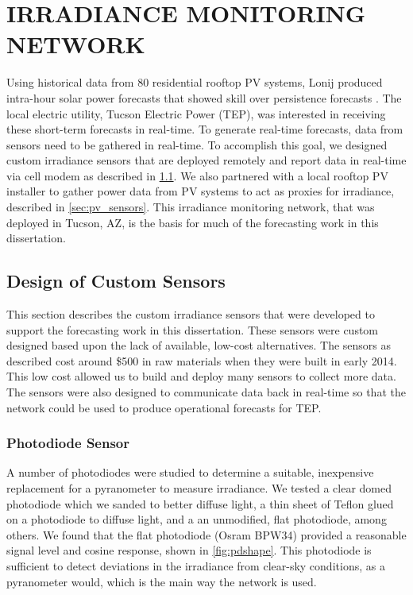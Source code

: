 \chapter{IRRADIANCE MONITORING NETWORK}
\label{chap:sens_net}

Using historical data from 80 residential rooftop PV systems, Lonij
\etal produced intra-hour solar power forecasts that showed skill over
persistence forecasts \citep{Lonij2013}.
The local electric utility, Tucson Electric Power (TEP), was interested in
receiving these short-term forecasts in real-time.
To generate real-time forecasts, data from sensors need to be gathered
in real-time.
To accomplish this goal, we designed custom irradiance sensors that
are deployed remotely and report data in real-time via cell modem as
described in \cref{sec:custom_sensors}.
We also partnered with a local rooftop PV installer to gather power
data from PV systems to act as proxies for irradiance, described in
\cref{sec:pv_sensors}.
This irradiance monitoring network, that was deployed in Tucson, AZ, is
the basis for much of the forecasting work in this dissertation.


\section{Design of Custom Sensors}
\label{sec:custom_sensors}
This section describes the custom irradiance sensors that were
developed to support the forecasting work in this dissertation.
These sensors were custom designed based upon the lack of available,
low-cost alternatives.
The sensors as described cost around \$500 in raw materials when they
were built in early 2014.
This low cost allowed us to build and deploy many sensors to collect
more data.
The sensors were also designed to communicate data back in real-time
so that the network could be used to produce operational forecasts for
TEP.

\subsection{Photodiode Sensor}
\label{sec:photodiode}
A number of photodiodes were studied to determine a suitable,
inexpensive replacement for a pyranometer to measure irradiance.
We tested a clear domed photodiode which we sanded to better diffuse
light, a thin sheet of Teflon glued on a photodiode to diffuse light,
and a an unmodified, flat photodiode, among others.
We found that the flat photodiode (Osram BPW34) provided a reasonable
signal level and cosine response, shown in \cref{fig:pdshape}.
This photodiode is sufficient to detect deviations in the irradiance from
clear-sky conditions, as a pyranometer would, which is the main way
the network is used.


